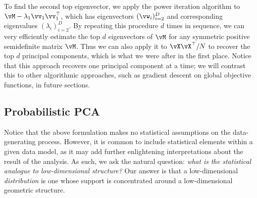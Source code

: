 \documentclass[../../book-main.tex]{subfiles}
\begin{document}
To find the second top eigenvector, we apply the power iteration algorithm to \(\vM - \lambda_{1}\vv_{1}\vv_{1}^{\top}\), which has eigenvectors \((\vw_{i})_{i = 2}^{D}\) and corresponding eigenvalues \((\lambda_{i})_{i = 2}^{D}\). By repeating this procedure \(d\) times in sequence, we can very efficiently estimate the top \(d\) eigenvectors of \(\vM\) for any symmetric positive semidefinite matrix \(\vM\). Thus we can also apply it to \(\vX\vX^{\top}/N\) to recover the top \(d\) principal components, which is what we were after in the first place. Notice that this approach recovers one principal component at a time; we will contrast this to other algorithmic approaches, such as gradient descent on global objective functions, in future sections.





\subsection{Probabilistic PCA}\label{subsec:probabilistic PCA}

Notice that the above formulation makes no statistical assumptions on the
data-generating process. However, it is common to include statistical elements
within a given data model, as it may add further enlightening interpretations
about the result of the analysis. As such, we ask the natural question:
\textit{what is the statistical analogue to low-dimensional structure?} Our answer is that a low-dimensional \textit{distribution} is one whose support is concentrated around a low-dimensional geometric structure. 
\end{document}
